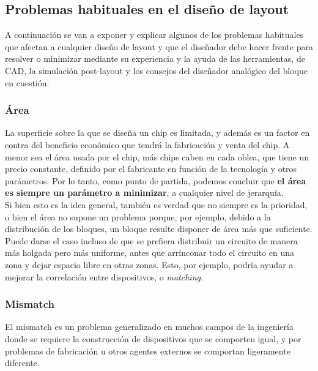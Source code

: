 \subsection{Problemas habituales en el diseño de layout}

A continuación se van a exponer y explicar algunos de los problemas habituales que
afectan a cualquier diseño de layout y que el diseñador debe hacer frente para
resolver o minimizar mediante su experiencia y la ayuda de las herramientas, de CAD,
la simulación post-layout y los consejos del diseñador analógico del bloque en cuestión.\\

\subsubsection{Área}

La superficie sobre la que se diseña un chip es limitada, y además es
un factor en contra del beneficio económico que tendrá la fabricación y venta del
chip. A menor sea el área usada por el chip, más chips caben en cada oblea, que tiene
un precio constante, definido por el fabricante en función de la tecnología y otros
parámetros. Por lo tanto, como punto de partida, podemos concluir que \textbf{el área
es siempre un parámetro a minimizar}, a cualquier nivel de jerarquía.\\

Si bien esto es la idea general, también es verdad que no siempre es
la prioridad, o bien el área no supone un problema porque, por ejemplo, debido a la
distribución de los bloques, un bloque resulte disponer de área más que suficiente.
Puede darse el caso incluso de que se prefiera distribuir un circuito de manera más
holgada pero más uniforme, antes que arrinconar todo el circuito en una zona y dejar
espacio libre en otras zonas. Esto, por ejemplo, podría ayudar a mejorar la correlación
entre dispositivos, o \textit{matching}.\\

\subsubsection{Mismatch}

El mismatch es un problema generalizado en muchos campos de
la ingeniería donde se requiere la construcción de dispositivos que se comporten
igual, y por problemas de fabricación u otros agentes externos se comportan ligeramente
diferente.\\

